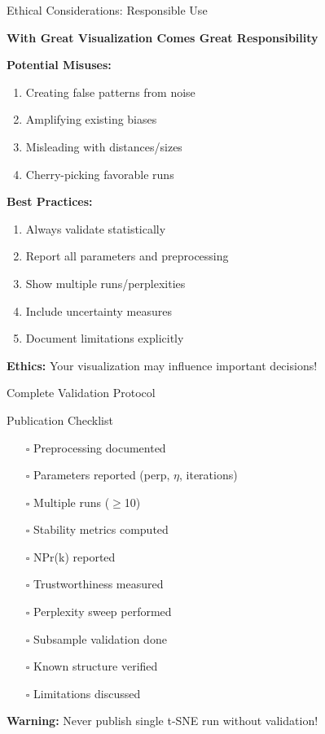 \documentclass[aspectratio=169]{beamer}
\newcommand{\warning}[1]{\colorbox{red!10}{\textcolor{warningcolor}{\textbf{Warning:} #1}}}
\newcommand{\ethics}[1]{\colorbox{purple!10}{\textcolor{ethicscolor}{\textbf{Ethics:} #1}}}
\begin{document}
\begin{frame}{Ethical Considerations: Responsible Use}
\begin{center}
\colorbox{red!30}{\Large\textbf{With Great Visualization Comes Great Responsibility}}
\end{center}

\textbf{Potential Misuses:}
\begin{enumerate}
\item Creating false patterns from noise
\item Amplifying existing biases
\item Misleading with distances/sizes
\item Cherry-picking favorable runs
\end{enumerate}

\textbf{Best Practices:}
\begin{enumerate}
\item Always validate statistically
\item Report all parameters and preprocessing
\item Show multiple runs/perplexities
\item Include uncertainty measures
\item Document limitations explicitly
\end{enumerate}

\ethics{Your visualization may influence important decisions!}
\end{frame}

\begin{frame}{Complete Validation Protocol}
\begin{block}{Publication Checklist}
\begin{enumerate}
\item[$\square$] Preprocessing documented
\item[$\square$] Parameters reported (perp, $\eta$, iterations)
\item[$\square$] Multiple runs ($\geq$10)
\item[$\square$] Stability metrics computed
\item[$\square$] NPr(k) reported
\item[$\square$] Trustworthiness measured
\item[$\square$] Perplexity sweep performed
\item[$\square$] Subsample validation done
\item[$\square$] Known structure verified
\item[$\square$] Limitations discussed
\end{enumerate}
\end{block}

\warning{Never publish single t-SNE run without validation!}
\end{frame}
\end{document}
